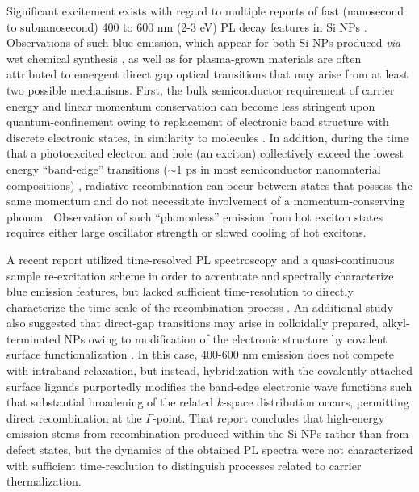 Significant excitement exists with regard to multiple reports of fast (nanosecond to subnanosecond) 400 to 600 nm (2-3 eV) PL decay features in Si NPs \cite{PhysRevLett.100.067401,de2010red,dohnalova2013surface,tsybeskov1994blue,valenta2008origin}. Observations of such blue emission, which appear for both Si NPs produced \emph{via} wet chemical synthesis \cite{yang1999synthesis,holmes2001highly}, as well as for plasma-grown materials \cite{PhysRevLett.100.067401} are often attributed to emergent direct gap optical transitions \cite{PhysRevLett.100.067401,de2010red,valenta2008origin} that may arise from at least two possible mechanisms. First, the bulk semiconductor requirement of carrier energy and linear momentum conservation can become less stringent upon quantum-confinement owing to replacement of electronic band structure with discrete electronic states, in similarity to molecules \cite{PhysRevLett.101.217401,PhysRevLett.75.3728}. In addition, during the time that a photoexcited electron and hole (an exciton) collectively exceed the lowest energy “band-edge” transitions ($\sim$1 ps in most semiconductor nanomaterial compositions) \cite{PhysRevLett.80.4028,PhysRevLett.95.196401}, radiative recombination can occur between states that possess the same momentum and do not necessitate involvement of a momentum-conserving phonon \cite{de2010red}. Observation of such “phononless” emission from hot exciton states requires either large oscillator strength or slowed cooling of hot excitons. \par

A recent report utilized time-resolved PL spectroscopy and a quasi-continuous sample re-excitation scheme in order to accentuate and spectrally characterize blue emission features, but lacked sufficient time-resolution to directly characterize the time scale of the recombination process \cite{de2010red}. An additional study also suggested that direct-gap transitions may arise in colloidally prepared, alkyl-terminated NPs owing to modification of the electronic structure by covalent surface functionalization \cite{dohnalova2013surface}. In this case, 400-600 nm emission does not compete with intraband relaxation, but instead, hybridization with the covalently attached surface ligands purportedly modifies the band-edge electronic wave functions such that substantial broadening of the related $k$-space distribution occurs, permitting direct recombination at the $\Gamma$-point. That report concludes that high-energy emission stems from recombination produced within the Si NPs rather than from defect states, but the dynamics of the obtained PL spectra were not characterized with sufficient time-resolution to distinguish processes related to carrier thermalization. \par

